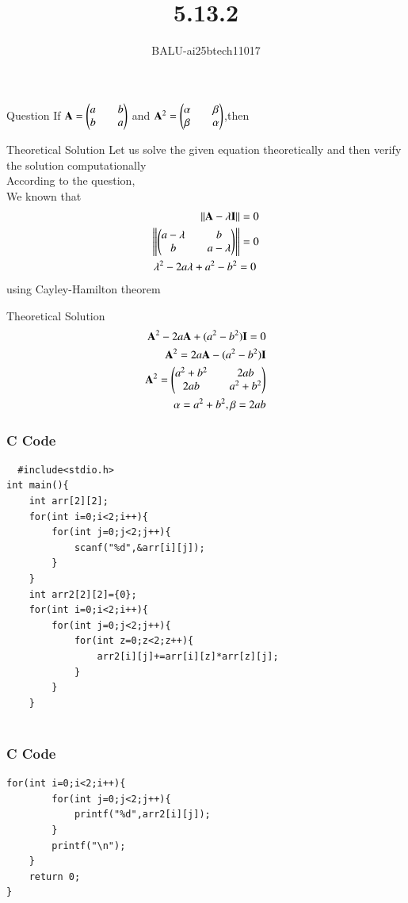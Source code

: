 \documentclass{beamer}
\title %
{5.13.2}
\author %
{BALU-ai25btech11017}
\begin{document}
\frame{\titlepage}
\begin{frame}{Question}
If $\mathbf{A}=\begin{pmatrix}a&&b\\b&&a\end{pmatrix}$ and $\mathbf{A}^2=\begin{pmatrix}\alpha&&\beta\\\beta&&\alpha\end{pmatrix}$,then
\\ 
\end{frame}
\begin{frame}{Theoretical Solution}
Let us solve the given equation theoretically and then verify the solution computationally \\
According to the question, \\
We known that\\
\begin{align}
    \|\mathbf{A}-\lambda\mathbf{I}\|=0\\
    \left\|\begin{pmatrix}a-\lambda&&b\\b&&a-\lambda\end{pmatrix}\right\|=0\\
    \lambda^2-2a\lambda+a^2-b^2=0\
\end{align}
using Cayley-Hamilton theorem
\end{frame}
\begin{frame}{Theoretical Solution}
\begin{align}
    \mathbf{A}^2-2a\mathbf{A}+(a^2-b^2)\mathbf{I}=0\\
    \mathbf{A}^2=2a\mathbf{A}-(a^2-b^2)\mathbf{I}\\
    \mathbf{A}^2=\begin{pmatrix}a^2+b^2&&2ab\\2ab&&a^2+b^2\end{pmatrix}\\
    \alpha=a^2+b^2,\beta=2ab
\end{align}
\end{frame}
\begin{frame}[fragile]
    \frametitle{C Code}

    \begin{lstlisting}
  #include<stdio.h>
int main(){
    int arr[2][2];
    for(int i=0;i<2;i++){
        for(int j=0;j<2;j++){
            scanf("%d",&arr[i][j]);
        }
    }
    int arr2[2][2]={0};
    for(int i=0;i<2;i++){
        for(int j=0;j<2;j++){
            for(int z=0;z<2;z++){
                arr2[i][j]+=arr[i][z]*arr[z][j];
            }
        }
    }
    
    \end{lstlisting}
\end{frame}
\begin{frame}[fragile]
    \frametitle{C Code }
    \begin{lstlisting}
for(int i=0;i<2;i++){
        for(int j=0;j<2;j++){
            printf("%d",arr2[i][j]);
        }
        printf("\n");
    }
    return 0;
}
   
    \end{lstlisting}
\end{frame}
\end{document}
